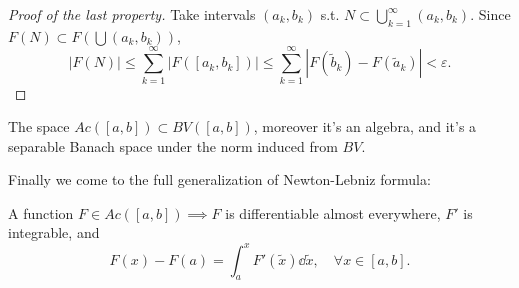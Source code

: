\begin{proof}[Proof of the last property]
    Take intervals $(a_k,b_k)$ s.t. $N \subset \bigcup_{k=1}^\infty (a_k, b_k)$.
	Since $F(N) \subset F(\bigcup (a_k,b_k))$,
	\[
		|F(N)| \le \sum_{k=1}^{\infty} |F([a_k, b_k])|\le \sum_{k=1}^{\infty}
		|F(\tilde b_k) - F(\tilde a_k)| < \varepsilon.
	\]
\end{proof}

\begin{proposition}
	The space $Ac([a,b]) \subset BV([a,b])$, moreover it's an algebra,
	and it's a separable Banach space under the norm induced from $BV$.
\end{proposition}

Finally we come to the full generalization of Newton-Lebniz formula:
\begin{theorem}
	A function $F\in Ac([a,b]) \implies F$ is differentiable almost everywhere,
	$F'$ is integrable, and
	\[
		F(x) - F(a) = \int_{a}^{x} F'(\tilde x)\dd \tilde x, \quad \forall x\in [a,b].
	\]
\end{theorem}
